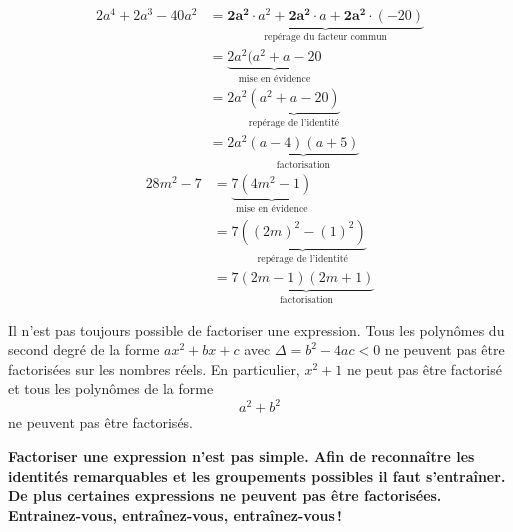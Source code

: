 \documentclass[a4paper,12pt]{report}
\begin{document}
\begin{tasks}
	\task 
	\vspace{-2em}
	\begin{align*}
		2a^4+2a^3-40a^2&=\underset{\text{repérage du facteur commun}}{\underbrace{\bm{2a^2}\cdot a^2+\bm{2a^2}\cdot a+\bm{2a^2}\cdot (-20)}}\\
			       &=\underset{\text{mise en évidence}}{\underbrace{2a^2(a^2+a-20}}\\										 &=2a^2\underset{\text{repérage de l'identité}}{\underbrace{(a^2+a-20)}}\\
			       &=2a^2\underset{\text{factorisation}}{\underbrace{(a-4)(a+5)}}
	\end{align*}
	\task 
	\vspace{-2em}
	\begin{align*}
	28m^2-7&=\underset{\text{mise en évidence}}{\underbrace{7(4m^2-1)}}\\
	       &=7\underset{\text{repérage de l'identité}}{\underbrace{((2m)^2-(1)^2)}}\\
	       &=7\underset{\text{factorisation}}{\underbrace{(2m-1)(2m+1)}}
	\end{align*}
\end{tasks}


\begin{rem}
	Il n'est pas toujours possible de factoriser une expression. Tous les polynômes du second degré de la forme $ax^2+bx+c$ avec $\Delta=b^2-4ac<0$ ne peuvent pas être factorisées sur les nombres réels. En particulier, $x^2+1$ ne peut pas être factorisé et tous les polynômes de la forme
	\[a^2+b^2\]
	ne peuvent pas être factorisés. 
\end{rem}

{\bfseries Factoriser une expression n'est pas simple. Afin de reconnaître les identités remarquables et les groupements possibles il faut s'entraîner. De plus certaines expressions ne peuvent pas être factorisées. Entrainez-vous, entraînez-vous, entraînez-vous\,!}
\end{document}
